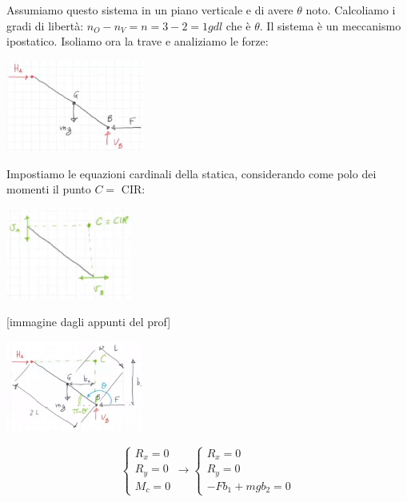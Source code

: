 Assumiamo questo sistema in un piano verticale e di avere $\theta$ noto.\newline
\newline
Calcoliamo i gradi di libertà: $n_O - n_V = n = 3 - 2 = 1 gdl$ che è $\theta$. Il sistema è un meccanismo ipostatico.\newline
\newline
Isoliamo ora la trave e analiziamo le forze:
\begin{center}
    \includegraphics[height=3cm]{../lezione6/img15.JPG}
\end{center}
Impostiamo le equazioni cardinali della statica, considerando come polo dei momenti il punto $C = $ CIR:
\begin{center}
    \includegraphics[height=3cm]{../lezione6/img16.JPG}
\end{center} 
[immagine dagli appunti del prof]
\begin{center}
    \includegraphics[height=3cm]{../lezione6/img17.JPG}
\end{center} 
\[
    \begin{cases}
        R_x = 0\\
        R_y = 0\\
        M_c = 0
    \end{cases} \rightarrow \begin{cases}
        R_x = 0\\
        R_y = 0\\
        -Fb_1 + mg b_2 = 0
    \end{cases}
\]
